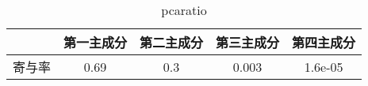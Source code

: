 \begin{table}[h]
  \centering
    \begin{tabular}{|c||c|c|c|c|} \hline
       & 第一主成分 & 第二主成分 & 第三主成分 & 第四主成分 \\ \hline
      寄与率 & 0.69 & 0.3 & 0.003 & 1.6e-05 \\ \hline
    \end{tabular}
  \caption{pcaratio}
  \label{tab:pca_ratio}
\end{table}
